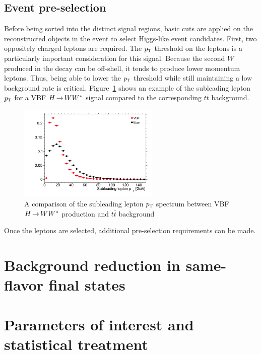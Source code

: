 \subsection{Event pre-selection}

Before being sorted into the distinct signal regions, basic cuts are applied on the reconstructed objects in the event to select Higgs-like event candidates. First, two oppositely charged leptons are required. The $p_{\textrm{\footnotesize\sc t}}$ threshold on the leptons is a particularly important consideration for this signal. Because the second $W$ produced in the decay can be off-shell, it tends to produce lower momentum leptons. Thus, being able to lower the $p_{\textrm{\footnotesize\sc t}}$ threshold while still maintaining a low background rate is critical. Figure~\ref{fig:leptonpt} shows an example of the subleading lepton $p_{\textrm{\footnotesize\sc t}}$ for a VBF $H{\,{\rightarrow}\,}WW^\ast$ signal compared to the corresponding $t\bar{t}$ background. 

\begin{figure}[h!]
  \centering
  \captionsetup{justification=centering}

  \includegraphics[width=0.6\textwidth]{figures/lepton_pt}
  \caption{A comparison of the subleading lepton $p_{\textrm{\footnotesize\sc t}}$ spectrum between VBF $H{\,{\rightarrow}\,}WW^\ast$ production and $t\bar{t}$ background}
  \label{fig:leptonpt}
\end{figure}

Once the leptons are selected, additional pre-selection requirements can be made. 



\section{Background reduction in same-flavor final states}
\section{Parameters of interest and statistical treatment}